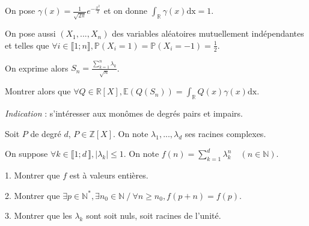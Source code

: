\noindent On pose $\displaystyle \gamma(x) = \frac {1} {\sqrt{2\pi}} e^{-\frac{x^2}{2}}$
et on donne $\displaystyle \int_{\mathbb{R}}^{} \gamma(x)\mathrm{dx} = 1$.

\vspace{5pt}
\noindent On pose aussi $(X_1, ..., X_n)$ des variables aléatoires mutuellement indépendantes et telles que
$\displaystyle \forall i \in \llbracket 1;n \rrbracket, \mathbb{P}(X_i = 1) = \mathbb{P}(X_i = -1) = \frac {1} {2}$.

\vspace{5pt}
\noindent On exprime alors $\displaystyle S_n = \frac {\sum_{k=1}^{n}\lambda_k} {\sqrt{n}}$.

\vspace{5pt}
\noindent Montrer alors que
$\displaystyle \forall Q \in \mathbb{R}[X], \mathbb{E}(Q(S_n)) = \int_{\mathbb{R}}^{}Q(x)\gamma(x)\mathrm{dx}$.

\vspace{10pt}
\noindent \textit{Indication} : s'intéresser aux monômes de degrés pairs et impairs.



\subetoiles



\noindent Soit $P$ de degré $d$, $P \in \mathbb{Z}[X]$. On note $\lambda_1, ..., \lambda_d$ ses racines complexes.

\vspace{5pt}
\noindent On suppose $\forall k \in \llbracket 1;d\, \rrbracket, |\lambda_k| \leqslant 1$.
On note $\displaystyle f(n) = \sum_{k=1}^{d} \lambda_k^n \quad (n \in \mathbb{N})$.

\vspace{5pt}
1. Montrer que $f$ est à valeurs entières.

\vspace{5pt}
2. Montrer que $\exists p \in \mathbb{N}^*, \exists n_0 \in \mathbb{N} \ / \ \forall n \geqslant n_0, f(p+n) = f(p)$.

\vspace{5pt}
3. Montrer que les $\lambda_k$ sont soit nuls, soit racines de l'unité.